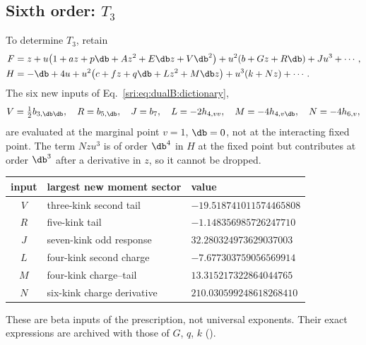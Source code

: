 \subsection{Sixth order: \texorpdfstring{$T_3$}{T3}}\label{sri:app:dualB:C6}
To determine $T_3$, retain
\begin{equation}
\begin{aligned}
 F&=z+u\bigl(1+az+p\db+Az^2+E\db z+V\db^2\bigr)+u^2(b+Gz+R\db)+Ju^3+\cdots,\\
 H&=-\db+4u+u^2\bigl(c+fz+q\db+Lz^2+M\db z\bigr)+u^3(k+Nz)+\cdots.
\end{aligned}
\label{sri:eq:dualB:beta6}
\end{equation}
The six new inputs of Eq.~\eqref{sri:eq:dualB:dictionary},
\begin{equation}
 V=\tfrac12b_{3,\db\db},\quad R=b_{5,\db},\quad J=b_7,\quad L=-2h_{4,vv},\quad M=-4h_{4,v\db},\quad N=-4h_{6,v},
 \label{sri:eq:dualB:C6inputs}
\end{equation}
are evaluated at the marginal point $v=1$, $\db=0$, not at the interacting fixed point. The term $Nzu^3$ is of order
$\db^4$ in $H$ at the fixed point but contributes at order $\db^3$ after a derivative in $z$, so it cannot be dropped.
\begin{center}\small
\begin{tabular}{@{}cll@{}}
\toprule
input & largest new moment sector & value\\
\midrule
$V$ & three-kink second tail & $-19.518741011574465808$\\
$R$ & five-kink tail & $-1.148356985726247710$\\
$J$ & seven-kink odd response & $32.280324973629037003$\\
$L$ & four-kink second charge & $-7.677303759056569914$\\
$M$ & four-kink charge--tail & $13.315217322864044765$\\
$N$ & six-kink charge derivative & $210.030599248618268410$\\
\bottomrule
\end{tabular}
\end{center}
These are beta inputs of the prescription, not universal exponents. Their exact expressions are archived with those
of $G$, $q$, $k$ ().

